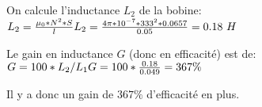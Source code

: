 On calcule l'inductance $L_{2}$ de la bobine: \\
\begin{math}
	L_{2} = \frac{\mu_0*N^2*S}{l} \\
	L_{2} = \frac{4\pi*10^{-7}*333^2*0.0657}{0.05}= 0.18\ H
\end{math}

Le gain en inductance $G$ (donc en efficacité) est de: \\
\begin{math}
	G = 100*L_{2}/L_{1} \\
	G = 100 * \frac{0.18}{0.049} = 367\%
\end{math}

Il y a donc un gain de $367\%$ d'efficacité en plus.

